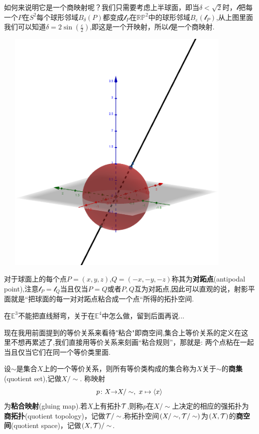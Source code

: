 如何来说明它是一个商映射呢？我们只需要考虑上半球面，即当$\delta < \sqrt{2}$时，$\mathcal{l}$把每一个$P$在$S^2$每个球形邻域$B_\delta(P)$都变成$\mathcal{l}_P$在$\mathbb{R}\mathbb{P}^2$中的球形邻域$B_\varepsilon(\mathcal{l}_P)$,从上图里面我们可以知道$\delta=2 \sin(\frac{\varepsilon}{2})$,即这是一个开映射，所以$\mathcal{l}$是一个商映射.

\begin{center}
\includegraphics[width=12cm, height=12cm]{images/antipodal_point.png}
\end{center}

对于球面上的每个点$P=(x,y,z)$,$Q=(-x,-y,-z)$称其为\textbf{对跖点}(antipodal point),注意$\mathcal{l}_P=\mathcal{l}_Q$当且仅当$P=Q$或者$P,Q$互为对跖点,因此可以直观的说，射影平面就是“把球面的每一对对跖点粘合成一个点“所得的拓扑空间.

在$\mathbb{E}^3$不能把直线掰弯，关于在$\mathbb{E}^4$中怎么做，留到后面再说...

现在我用前面提到的等价关系来看待"粘合"即商空间,集合上等价关系的定义在这里不想再累述了,我们直接用等价关系来刻画“粘合规则”，那就是: 两个点粘在一起当且仅当它们在同一个等价类里面. 

\begin{definition}
设$\sim$是集合$X$上的一个等价关系，则所有等价类构成的集合称为$X$关于$\sim$的\textbf{商集}(quotient set),记做$X / \sim$. 称映射\[{p}\colon{X}{\to}{X / \sim},\ x \mapsto \left<x\right>\]为\textbf{粘合映射}(gluing map).若$X$上有拓扑$\mathcal{T}$,则称$p$在$X / \sim$上决定的相应的强拓扑为\textbf{商拓扑}(quotient topology)，记做$\mathcal{T} / \sim$.称拓扑空间$(X / \sim, \mathcal{T} /\sim)$为$(X,\mathcal{T})$的\textbf{商空间}(quotient space)，记做$(X,\mathcal{T}) / \sim$.
\end{definition}


